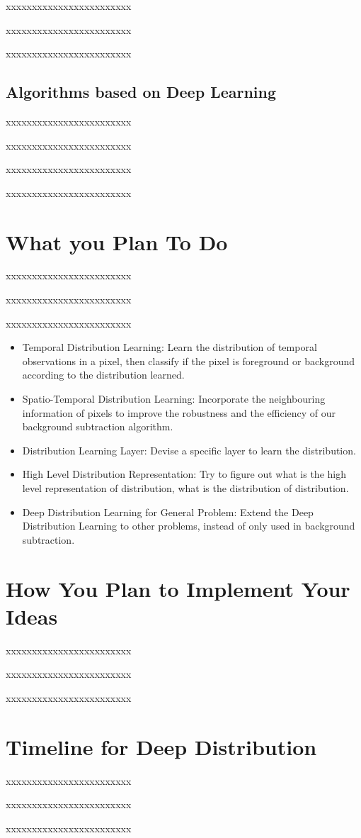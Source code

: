 \documentclass[UTF8]{article}
\begin{document}
xxxxxxxxxxxxxxxxxxxxxxxx

xxxxxxxxxxxxxxxxxxxxxxxx

xxxxxxxxxxxxxxxxxxxxxxxx

\subsection{Algorithms based on Deep Learning}
xxxxxxxxxxxxxxxxxxxxxxxx

xxxxxxxxxxxxxxxxxxxxxxxx

xxxxxxxxxxxxxxxxxxxxxxxx

xxxxxxxxxxxxxxxxxxxxxxxx

\section*{What you Plan To Do}
xxxxxxxxxxxxxxxxxxxxxxxx

xxxxxxxxxxxxxxxxxxxxxxxx

xxxxxxxxxxxxxxxxxxxxxxxx

\begin{itemize}
	\item Temporal Distribution Learning:
	Learn the distribution of temporal observations in a pixel, then classify if the pixel is foreground or background according to the distribution learned.
	\item Spatio-Temporal Distribution Learning:
	Incorporate the neighbouring information of pixels to improve the robustness and the efficiency of our background subtraction algorithm.
	\item Distribution Learning Layer:
	Devise a specific layer to learn the distribution.
	\item High Level Distribution Representation:
	Try to figure out what is the high level representation of distribution, what is the distribution of distribution.
	\item Deep Distribution Learning for General Problem:
	Extend the Deep Distribution Learning to other problems, instead of only used in background subtraction.
\end{itemize}

\section*{How You Plan to Implement Your Ideas}
xxxxxxxxxxxxxxxxxxxxxxxx

xxxxxxxxxxxxxxxxxxxxxxxx

xxxxxxxxxxxxxxxxxxxxxxxx


\section*{Timeline for Deep Distribution}

xxxxxxxxxxxxxxxxxxxxxxxx

xxxxxxxxxxxxxxxxxxxxxxxx

xxxxxxxxxxxxxxxxxxxxxxxx



\small

% 
  
\end{document}
